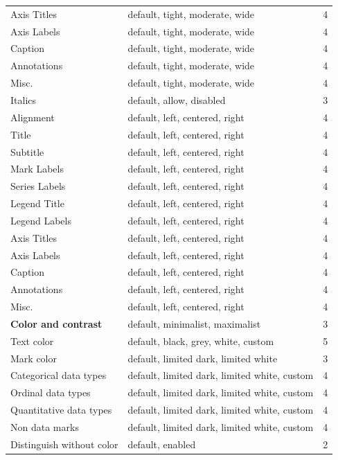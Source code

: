 \documentclass[12pt]{cmuthesis}
\begin{document}
{\begin{longtable}{@{}l p{7.2cm} r@{}}
\qquad Axis Titles & default, tight, moderate, wide & 4 \\
\qquad Axis Labels & default, tight, moderate, wide & 4 \\
\qquad Caption & default, tight, moderate, wide & 4 \\
\qquad Annotations & default, tight, moderate, wide & 4 \\
\qquad Misc. & default, tight, moderate, wide & 4 \\
\quad Italics & default, allow, disabled & 3 \\
\quad Alignment & default, left, centered, right & 4 \\
\qquad Title & default, left, centered, right & 4 \\
\qquad Subtitle & default, left, centered, right & 4 \\
\qquad Mark Labels & default, left, centered, right & 4 \\
\qquad Series Labels & default, left, centered, right & 4 \\
\qquad Legend Title & default, left, centered, right & 4 \\
\qquad Legend Labels & default, left, centered, right & 4 \\
\qquad Axis Titles & default, left, centered, right & 4 \\
\qquad Axis Labels & default, left, centered, right & 4 \\
\qquad Caption & default, left, centered, right & 4 \\
\qquad Annotations & default, left, centered, right & 4 \\
\qquad Misc. & default, left, centered, right & 4 \\
\addlinespace
\textbf{Color and contrast} & default, minimalist, maximalist & 3 \\
\quad Text color & default, black, grey, white, custom & 5 \\
\quad Mark color & default, limited dark, limited white & 3 \\
\qquad Categorical data types & default, limited dark, limited white, custom & 4 \\
\qquad Ordinal data types & default, limited dark, limited white, custom & 4 \\
\qquad Quantitative data types & default, limited dark, limited white, custom & 4 \\
\qquad Non data marks & default, limited dark, limited white, custom & 4 \\
\quad Distinguish without color & default, enabled & 2 \\

\end{longtable}}
\end{document}

